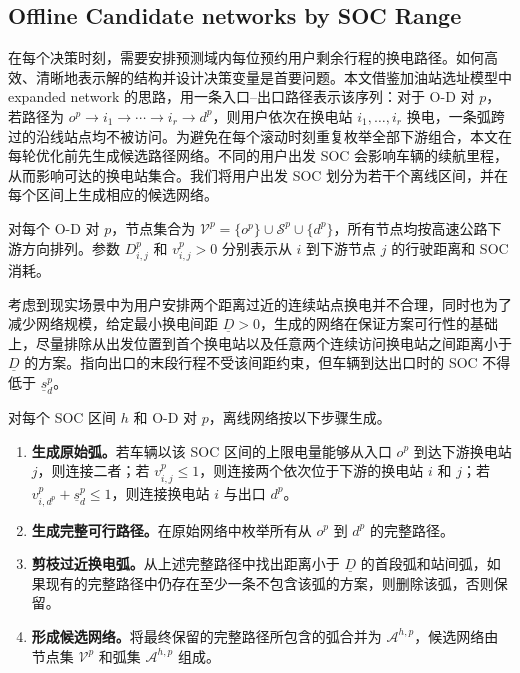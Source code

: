 \documentclass[12pt,a4paper,UTF8]{ctexart}
\begin{document}
\subsection{Offline Candidate networks by SOC Range}

在每个决策时刻，需要安排预测域内每位预约用户剩余行程的换电路径。如何高效、清晰地表示解的结构并设计决策变量是首要问题。本文借鉴加油站选址模型中 expanded network 的思路，用一条入口--出口路径表示该序列：对于 O-D 对 $p$，若路径为
$o^p\rightarrow i_1\rightarrow\cdots\rightarrow i_r\rightarrow d^p$，则用户依次在换电站 $i_1,\ldots,i_r$ 换电，一条弧跨过的沿线站点均不被访问。为避免在每个滚动时刻重复枚举全部下游组合，本文在每轮优化前先生成候选路径网络。不同的用户出发 SOC 会影响车辆的续航里程，从而影响可达的换电站集合。我们将用户出发 SOC 划分为若干个离线区间，并在每个区间上生成相应的候选网络。

对每个 O-D 对 $p$，节点集合为
$\mathcal V^p=\{o^p\}\cup\mathcal S^p\cup\{d^p\}$，所有节点均按高速公路下游方向排列。参数 $D_{i,j}^p$ 和 $v_{i,j}^p>0$ 分别表示从 $i$ 到下游节点 $j$ 的行驶距离和 SOC 消耗。

考虑到现实场景中为用户安排两个距离过近的连续站点换电并不合理，同时也为了减少网络规模，给定最小换电间距 $\underline D>0$，生成的网络在保证方案可行性的基础上，尽量排除从出发位置到首个换电站以及任意两个连续访问换电站之间距离小于 $\underline D$ 的方案。指向出口的末段行程不受该间距约束，但车辆到达出口时的 SOC 不得低于 $\underline s_d^p$。

对每个 SOC 区间 $h$ 和 O-D 对 $p$，离线网络按以下步骤生成。

\begin{enumerate}
  \item[\textbf{Step 1.}] \textbf{生成原始弧。}若车辆以该 SOC 区间的上限电量能够从入口 $o^p$ 到达下游换电站 $j$，则连接二者；若 $v_{i,j}^p\le1$，则连接两个依次位于下游的换电站 $i$ 和 $j$；若 $v_{i,d^p}^p+\underline s_d^p\le1$，则连接换电站 $i$ 与出口 $d^p$。

  \item[\textbf{Step 2.}] \textbf{生成完整可行路径。}在原始网络中枚举所有从 $o^p$ 到 $d^p$ 的完整路径。

  \item[\textbf{Step 3.}] \textbf{剪枝过近换电弧。}从上述完整路径中找出距离小于 $\underline D$ 的首段弧和站间弧，如果现有的完整路径中仍存在至少一条不包含该弧的方案，则删除该弧，否则保留。

  \item[\textbf{Step 4.}] \textbf{形成候选网络。}将最终保留的完整路径所包含的弧合并为 $\mathcal A^{h,p}$，候选网络由节点集 $\mathcal V^p$ 和弧集 $\mathcal A^{h,p}$ 组成。
\end{enumerate}
\end{document}
